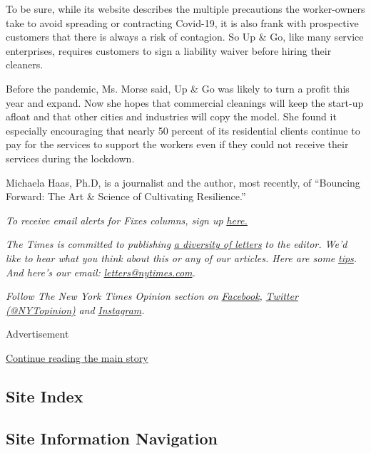 To be sure, while its website describes the multiple precautions the
worker-owners take to avoid spreading or contracting Covid-19, it is
also frank with prospective customers that there is always a risk of
contagion. So Up \& Go, like many service enterprises, requires
customers to sign a liability waiver before hiring their cleaners.

Before the pandemic, Ms. Morse said, Up \& Go was likely to turn a
profit this year and expand. Now she hopes that commercial cleanings
will keep the start-up afloat and that other cities and industries will
copy the model. She found it especially encouraging that nearly 50
percent of its residential clients continue to pay for the services to
support the workers even if they could not receive their services during
the lockdown.

Michaela Haas, Ph.D, is a journalist and the author, most recently, of
``Bouncing Forward: The Art \& Science of Cultivating Resilience.''

\emph{To receive email alerts for Fixes columns, sign up}
\href{http://eepurl.com/ABIxL}{\emph{here.}}

\emph{The Times is committed to publishing}
\href{https://www.nytimes.com/2019/01/31/opinion/letters/letters-to-editor-new-york-times-women.html}{\emph{a
diversity of letters}} \emph{to the editor. We'd like to hear what you
think about this or any of our articles. Here are some}
\href{https://help.nytimes.com/hc/en-us/articles/115014925288-How-to-submit-a-letter-to-the-editor}{\emph{tips}}\emph{.
And here's our email:}
\href{mailto:letters@nytimes.com}{\emph{letters@nytimes.com}}\emph{.}

\emph{Follow The New York Times Opinion section on}
\href{https://www.facebook.com/nytopinion}{\emph{Facebook}}\emph{,}
\href{http://twitter.com/NYTOpinion}{\emph{Twitter (@NYTopinion)}}
\emph{and}
\href{https://www.instagram.com/nytopinion/}{\emph{Instagram}}\emph{.}

Advertisement

\protect\hyperlink{after-bottom}{Continue reading the main story}

\hypertarget{site-index}{%
\subsection{Site Index}\label{site-index}}

\hypertarget{site-information-navigation}{%
\subsection{Site Information
Navigation}\label{site-information-navigation}}


